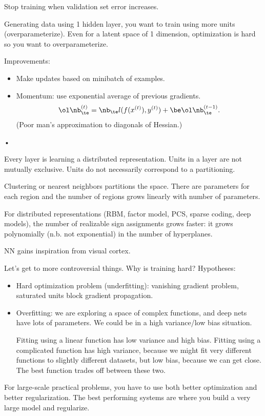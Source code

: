 Stop training when validation set error increases.

Generating data using 1 hidden layer, you want to train using more units (overparameterize). Even for a latent space of 1 dimension, optimization is hard so you want to  overparameterize.

Improvements:
\begin{itemize}
\item
Make updates based on minibatch of examples.
\item
Momentum: use exponential average of previous gradients.
$$
\ol \nb_\te^{(t)} = \nb_\te l(f(x^{(t)}), y^{(t)}) + \be \ol \nb_\te^{(t-1)}.
$$
(Poor man's approximation to diagonals of Hessian.)
\end{itemize}•

Every layer is learning a distributed representation. Units in a layer are not mutually exclusive. Units do not necessarily correspond to a partitioning.

Clustering or nearest neighbors partitions the space. There are parameters for each region and the number of regions grows linearly with number of parameters.

For distributed representations (RBM, factor model, PCS, sparse coding, deep models), the number of realizable sign assignments grows faster:  it grows polynomially (n.b. not exponential) in the number of hyperplanes. 

NN gains inspiration from visual cortex. 

Let's get to more controversial things. Why is training hard? Hypotheses:
\begin{itemize}
\item Hard optimization problem (underfitting): vanishing gradient problem, saturated units block gradient propagation. 
\item
Overfitting: we are exploring a space of complex functions, and deep nets have lots of parameters. We could be in a high variance/low bias situation.

Fitting using a linear function has  low variance and high bias. Fitting using a complicated function has high variance, because we might fit very different functions to slightly different datasets, but low bias, because we can get close. The best function trades off between these two.
\end{itemize}
For large-scale practical problems, you have to use both better optimization and better regularization.
The best performing systems are where you build a very large model and regularize.

